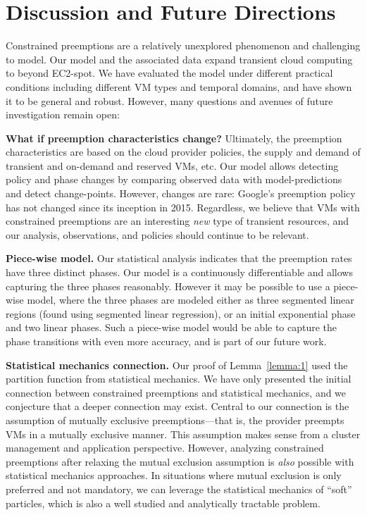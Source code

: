 \section{Discussion and Future Directions}


Constrained preemptions are a relatively unexplored phenomenon and challenging to model.
Our model and the associated data expand transient cloud computing to beyond EC2-spot.
We have evaluated the model under different practical conditions including different VM types and temporal domains, and have shown it to be general and robust. 
However, many questions and avenues of future investigation remain open:

\noindent \textbf{What if preemption characteristics change?}
Ultimately, the preemption characteristics are based on the cloud provider policies, the supply and demand of transient and on-demand and reserved VMs, etc. 
Our model allows detecting policy and phase changes by comparing observed data with model-predictions and detect change-points.
However, changes are rare: Google's preemption policy has not changed since its inception in 2015. 
Regardless, we believe that VMs with constrained preemptions are an interesting \emph{new} type of transient resources, and our analysis, observations, and policies should continue to be relevant. 


\noindent \textbf{Piece-wise model.}
Our statistical analysis indicates that the preemption rates have three distinct phases. 
Our model is a continuously differentiable and allows capturing the three phases reasonably. 
However it may be possible to use a piece-wise model, where the three phases are modeled either as three segmented linear regions (found using segmented linear regression), or an initial exponential phase and two linear phases. 
Such a piece-wise model would be able to capture the phase transitions with even more accuracy, and is part of our future work. 

\noindent \textbf{Statistical mechanics connection.} Our proof of Lemma~\ref{lemma:1} used the partition function from statistical mechanics. 
We have only presented the initial connection between constrained preemptions and statistical mechanics, and we conjecture that a deeper connection may exist. 
Central to our connection is the assumption of mutually exclusive preemptions---that is, the provider preempts VMs in a mutually exclusive manner.
This assumption makes sense from a cluster management and application perspective. 
However,  analyzing constrained preemptions after relaxing the mutual exclusion assumption is \emph{also} possible with statistical mechanics approaches. 
In situations where mutual exclusion is only preferred and not mandatory, we can leverage the statistical mechanics of ``soft'' particles, which is also a well studied and analytically tractable problem. 

